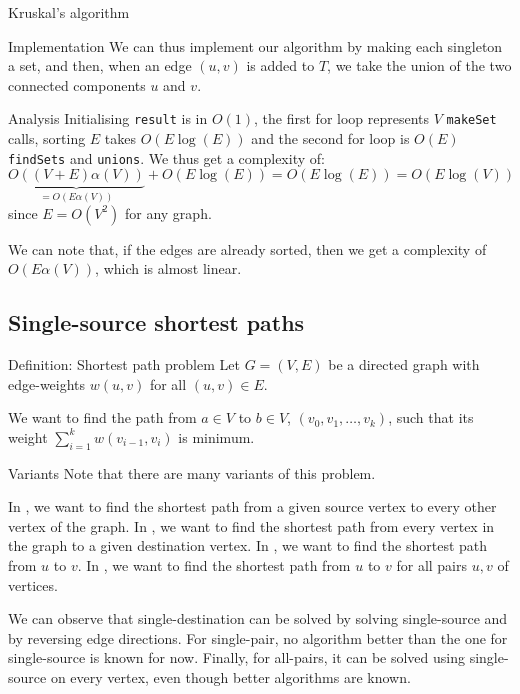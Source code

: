 \documentclass[a4paper]{article}
\begin{document}
\begin{parag}{Kruskal's algorithm}
\begin{subparag}{Implementation}
        We can thus implement our algorithm by making each singleton a set, and then, when an edge $\left(u, v\right)$ is added to $T$, we take the union of the two connected components $u$ and $v$.
    \end{subparag}

    \begin{subparag}{Analysis}
        Initialising \texttt{result} is in $O\left(1\right)$, the first for loop represents $V$ \texttt{makeSet} calls, sorting $E$ takes $O\left(E \log\left(E\right)\right)$ and the second for loop is $O\left(E\right)$ \texttt{findSets} and \texttt{unions}. We thus get a complexity of: 
        \[\underbrace{O\left(\left(V + E\right) \alpha\left(V\right)\right)}_{= O\left(E \alpha\left(V\right)\right)} + O\left(E \log\left(E\right)\right) = O\left(E \log\left(E\right)\right) = O\left(E \log\left(V\right)\right)\]
        since $E = O\left(V^2\right)$ for any graph.

        We can note that, if the edges are already sorted, then we get a complexity of $O\left(E \alpha\left(V\right)\right)$, which is almost linear.
    \end{subparag}
\end{parag}

\subsection{Single-source shortest paths}
\begin{parag}{Definition: Shortest path problem}
    Let $G = \left(V, E\right)$ be a directed graph with edge-weights $w\left(u, v\right)$ for all $\left(u, v\right) \in E$.

    We want to find the path from $a \in V$ to $b \in V$, $\left(v_0, v_1, \ldots, v_k\right)$, such that its weight $\sum_{i=1}^{k} w\left(v_{i-1}, v_i\right)$ is minimum.
    
    \begin{subparag}{Variants}
        Note that there are many variants of this problem.

        In , we want to find the shortest path from a given source vertex to every other vertex of the graph. In , we want to find the shortest path from every vertex in the graph to a given destination vertex. In , we want to find the shortest path from $u$ to $v$. In , we want to find the shortest path from $u$ to $v$ for all pairs $u, v$ of vertices.

        We can observe that single-destination can be solved by solving single-source and by reversing edge directions. For single-pair, no algorithm better than the one for single-source is known for now. Finally, for all-pairs, it can be solved using single-source on every vertex, even though better algorithms are known.
    \end{subparag}
    
\end{parag}
\end{document}
